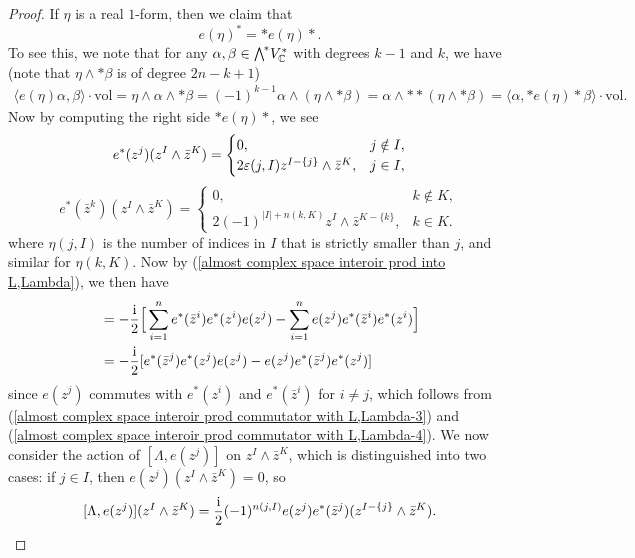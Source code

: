 \documentclass[11pt]{book}
\theoremstyle{definition}
\begin{document}
\begin{proof}
If $\eta$ is a real $1$-form, then we claim that
\[e(\eta)^*=\ast e(\eta)\ast.\]
To see this, we note that for any $\alpha,\beta\in\bigw^*V^*_{\C}$ with degrees $k-1$ and $k$, we have (note that $\eta\wedge\ast\beta$ is of degree $2n-k+1$)
\begin{align*}
\langle e(\eta)\alpha,\beta\rangle\cdot\mathrm{vol}=\eta\wedge\alpha\wedge\ast\beta=(-1)^{k-1}\alpha\wedge(\eta\wedge\ast\beta)=\alpha\wedge\ast\ast(\eta\wedge\ast\beta)=\langle\alpha,\ast e(\eta)\ast\beta\rangle\cdot\mathrm{vol}.
\end{align*}
Now by computing the right side $\ast e(\eta)\ast$, we see
\begin{equation}\label{almost complex space interoir prod commutator with L,Lambda-3}
e^*(z^j)(z^I\wedge\bar{z}^K)=\begin{cases}
0,&j\notin I,\\
2\varepsilon(j,I)z^{I-\{j\}}\wedge\bar{z}^K,&j\in I,
\end{cases}
\end{equation}
\begin{equation}\label{almost complex space interoir prod commutator with L,Lambda-4}
e^*(\bar{z}^k)(z^I\wedge\bar{z}^K)=\begin{cases}
0,&k\notin K,\\
2(-1)^{|I|+n(k,K)}z^I\wedge\bar{z}^{K-\{k\}},&k\in K.
\end{cases}
\end{equation}
where $\eta(j,I)$ is the number of indices in $I$ that is strictly smaller than $j$, and similar for $\eta(k,K)$. Now by (\ref{almost complex space interoir prod into L,Lambda}), we then have
\begin{align*}
[\Lambda,e(z^j)]&=-\frac{\i}{2}\Big[\sum_{i=1}^{n}e^*(\bar{z}^i)e^*(z^i)e(z^j)-\sum_{i=1}^{n}e(z^j)e^*(\bar{z}^i)e^*(z^i)\Big]\\
&=-\frac{\i}{2}[e^*(\bar{z}^j)e^*(z^j)e(z^j)-e(z^j)e^*(\bar{z}^j)e^*(z^j)]
\end{align*}
since $e(z^j)$ commutes with $e^*(z^i)$ and $e^*(\bar{z}^i)$ for $i\neq j$, which follows from (\ref{almost complex space interoir prod commutator with L,Lambda-3}) and (\ref{almost complex space interoir prod commutator with L,Lambda-4}). We now consider the action of $[\Lambda,e(z^j)]$ on $z^I\wedge\bar{z}^K$, which is distinguished into two cases: if $j\in I$, then $e(z^j)(z^I\wedge\bar{z}^K)=0$, so
\[[\Lambda,e(z^j)](z^I\wedge\bar{z}^K)=\frac{\mathrm{i}}{2}(-1)^{n(j,I)}e(z^j)e^*(\bar{z}^j)(z^{I-\{j\}}\wedge\bar{z}^K).\]

\end{proof}
\end{document}
